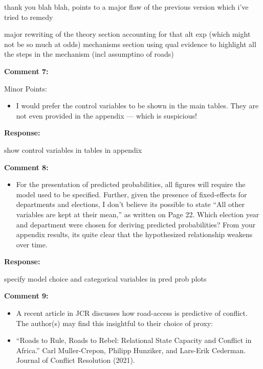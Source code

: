 \documentclass[12pt, a4paper, notitlepage]{article}
\begin{document}
thank you blah blah, points to a major flaw of the previous version which i've tried to remedy

major rewriting of the theory section
accounting for that alt exp (which might not be so much at odds)
mechanisms section using qual evidence to highlight all the steps in the mechanism (incl assumptino of roads)

\vspace{15pt}
\noindent\textbf{Comment 7:}
\begin{displayquote}
Minor Points:
\begin{itemize}
\item I would prefer the control variables to be shown in the main tables. They are not even provided in the appendix — which is suspicious!
\end{itemize}
\end{displayquote}

\noindent\textbf{Response:} {}

show control variables in tables in appendix

\vspace{15pt}
\noindent\textbf{Comment 8:}
\begin{displayquote}
\begin{itemize}
\item For the presentation of predicted probabilities, all figures will require the model used to be specified. Further, given the presence of fixed-effects for departments and elections, I don’t believe its possible to state “All other variables are kept at their mean,” as written on Page 22. Which election year and department were chosen for deriving predicted probabilities? From your appendix results, its quite clear that the hypothesized relationship weakens over time.
\end{itemize}
\end{displayquote}

\noindent\textbf{Response:} {}

specify model choice and categorical variables in pred prob plots

\vspace{15pt}
\noindent\textbf{Comment 9:}
\begin{displayquote}
\begin{itemize}
\item A recent article in JCR discusses how road-access is predictive of conflict. The author(s) may find this insightful to their choice of proxy:
\item[] ``Roads to Rule, Roads to Rebel: Relational State Capacity and Conflict in Africa.'' Carl Muller-Crepon, Philipp Hunziker, and Lars-Erik Cederman. Journal of Conflict Resolution (2021).
\end{itemize}
\end{displayquote}
\end{document}
